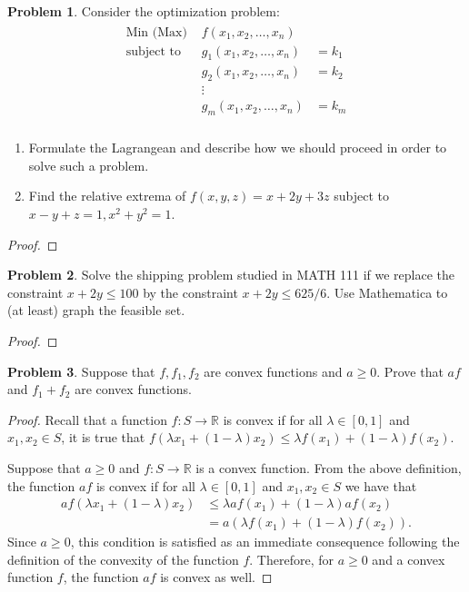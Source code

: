 \documentclass[12pt]{article}
\theoremstyle{definition}
\newtheorem{problem}{Problem}
\begin{document}
\begin{problem}
  Consider the optimization problem:
  \begin{align*}
    \begin{array} {lcl}
      \text{Min (Max) } & f(x_1, x_2, \dots, x_n) & \\
      \text{subject to } & g_1(x_1, x_2, \dots, x_n) &= k_1 \\
      & g_2(x_1, x_2, \dots, x_n) &= k_2 \\
      & \vdots & \\
      & g_m(x_1, x_2, \dots, x_n) &= k_m \\
    \end{array}
  \end{align*}
  \begin{enumerate}
    \item Formulate the Lagrangean and describe how we should proceed in order
      to solve such a problem.
    \item Find the relative extrema of $f(x, y, z) = x + 2y + 3z$ subject to
      $x - y + z = 1, x^2 + y^2 = 1$.
  \end{enumerate}
\end{problem}

\begin{proof}
\end{proof}
\newpage


\begin{problem}
  Solve the shipping problem studied in MATH 111 if we replace the constraint
  $x + 2y \leq 100$ by the constraint $x + 2y \leq 625/6$. Use Mathematica to
  (at least) graph the feasible set.
\end{problem}

\begin{proof}
\end{proof}
\newpage


\begin{problem}
  Suppose that $f, f_1, f_2$ are convex functions and $a \geq 0$. Prove that
  $af$ and $f_1 + f_2$ are convex functions.
\end{problem}

\begin{proof}
  Recall that a function $f:S \to \mathbb{R}$ is convex if for all $\lambda \in [0, 1]$
  and $x_1, x_2 \in S$, it is true that $f(\lambda x_1 + (1-\lambda)x_2) \leq \lambda f(x_1) + (1-\lambda)f(x_2)$.

  Suppose that $a \geq 0$ and $f:S \to \mathbb{R}$ is a convex function. From the above definition, the function
  $af$ is convex if for all $\lambda \in [0, 1]$
  and $x_1, x_2 \in S$ we have that
  \begin{align*}
    af(\lambda x_1 + (1-\lambda)x_2)
    &\leq \lambda af(x_1) + (1-\lambda)af(x_2) \\
    &= a(\lambda f(x_1) + (1-\lambda)f(x_2)).
  \end{align*}
  Since $a \geq 0$, this condition is satisfied as an immediate consequence
  following the definition of the convexity of the function $f$. Therefore, for
  $a \geq 0$ and a convex function $f$, the function $af$ is convex as well.
\end{proof}
\newpage
\end{document}
